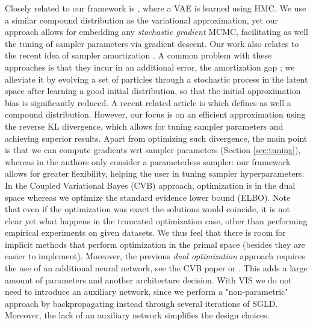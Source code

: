 {Closely related to our framework is \cite{hoffman2017learning}, where a VAE is learned using HMC. We use a similar compound distribution as the variational approximation, yet 
our approach allows for embedding any \emph{stochastic gradient} MCMC, %
facilitating as well the tuning of sampler parameters via gradient descent.
Our work also relates to the recent idea of 
sampler amortization \cite{feng2017learning}. 
A common problem with these approaches is that they incur in an additional error, the amortization gap \cite{cremer2018inference}; we alleviate it 
by evolving a set of particles through a stochastic process in the latent space after learning a good initial distribution,
so that %
the initial approximation bias is significantly reduced.
A recent related article is \cite{pmlr-v97-ruiz19a}
which defines as well a compound distribution. 
However, our focus is on an efficient approximation using the reverse KL divergence, %
which allows for tuning sampler parameters and achieving superior results. Apart from optimizing such divergence, %
the main point is that we can compute gradients wrt sampler parameters %
(Section \ref{sec:tuning}), whereas in \cite{pmlr-v97-ruiz19a} the authors only consider a parameterless sampler: %
our framework allows for greater flexibility, helping the user
in tuning  sampler hyperparameters.
In the Coupled Variational Bayes (CVB) \cite{dai2018coupled} approach,
optimization is in the dual space whereas
we  optimize the standard
evidence lower bound (ELBO). Note that even if the optimization was exact the solutions would coincide, it is not clear yet what happens in the truncated optimization case,%
other than performing empirical experiments on given datasets. We thus feel that there is room for implicit methods that perform optimization in the primal space 
(besides they are easier to implement). Moreover,
the previous \emph{dual optimization} approach requires the use of an additional neural network, see the CVB paper or \cite{fang2019implicit}. This adds a large amount of parameters and another architecture decision. With VIS we do not need to introduce an auxiliary network, since we perform a "non-parametric" approach by backpropagating instead through 
several iterations of SGLD. %
Moreover, the lack of an auxiliary network simplifies the design choices.
}


